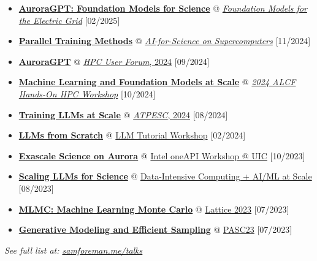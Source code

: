 \documentclass[
  letterpaper,
  DIV=11,
  numbers=noendperiod]{scrartcl}
\providecommand{\tightlist}{%
  \setlength{\itemsep}{0pt}\setlength{\parskip}{0pt}}\usepackage{longtable,booktabs,array}
\begin{document}
\begin{itemize}
\tightlist
\item
  \href{http://localhost:4209/talks/aurora-gpt-fm-for-electric-grid/}{\textbf{AuroraGPT:
  Foundation Models for Science}} @
  \href{https://www.alcf.anl.gov/alcf-ai-science-training-series}{\emph{Foundation
  Models for the Electric Grid}} {[}02/2025{]}
\item
  \href{http://localhost:4209/talks/ai-for-science-2024/}{\textbf{Parallel
  Training Methods}} @
  \href{https://www.alcf.anl.gov/alcf-ai-science-training-series}{\emph{AI-for-Science
  on Supercomputers}} {[}11/2024{]}
\item
  \href{https://samforeman.me/talks/hpc-user-forum/}{\textbf{AuroraGPT}}
  @
  \href{https://www.hpcuserforum.com/hpc-user-forum-fall-2024/}{\emph{HPC
  User Forum}, 2024} {[}09/2024{]}
\item
  \href{https://samforeman.me/talks/alcf-hpc-workshop-2024/}{\textbf{Machine
  Learning and Foundation Models at Scale}} @
  \href{https://www.alcf.anl.gov/events/2024-alcf-hands-hpc-workshop}{\emph{2024
  ALCF Hands-On HPC Workshop}} {[}10/2024{]}
\item
  \href{https://samforeman.me/talks/llms-at-scale/}{\textbf{Training
  LLMs at Scale}} @
  \href{https://extremecomputingtraining.anl.gov/atpesc-2024/}{\emph{ATPESC},
  2024} {[}08/2024{]}
\item
  \href{https://saforem2.github.io/llm-workshop-talk}{\textbf{LLMs from
  Scratch}} @ \href{https://github.com/argonne-lcf/llm-workshop}{LLM
  Tutorial Workshop} {[}02/2024{]}
\item
  \href{https://saforem2.github.io/oneapi-talk}{\textbf{Exascale Science
  on Aurora}} @
  \href{https://www.alcf.anl.gov/events/alcf-hands-hpc-workshop}{Intel
  oneAPI Workshop @ UIC} {[}10/2023{]}
\item
  \href{https://saforem2.github.io/scaling4science}{\textbf{Scaling LLMs
  for Science}} @
  \href{https://events.cels.anl.gov/event/426/overview}{Data-Intensive
  Computing + AI/ML at Scale} {[}08/2023{]}
\item
  \href{https://saforem2.github.io/lattice23}{\textbf{MLMC: Machine
  Learning Monte Carlo}} @
  \href{https://indico.fnal.gov/event/57249/contributions/271305/}{Lattice
  2023} {[}07/2023{]}
\item
  \href{https://saforem2.github.io/lqcd-pasc23/}{\textbf{Generative
  Modeling and Efficient Sampling}} @
  \href{https://pasc23.pasc-conference.org/}{PASC23} {[}07/2023{]}
\end{itemize}

\emph{See full list at:
\href{https://samforeman.me/talks/}{samforeman.me/talks}}
\end{document}
